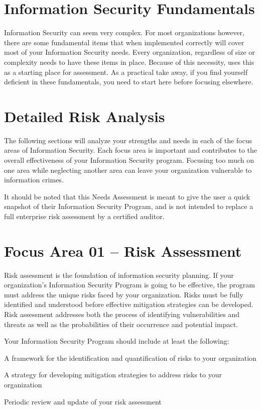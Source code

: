 \documentclass{needs}
\begin{document}
		\overallResults
	
	\section{Information Security Fundamentals}
		Information Security can seem very complex.  For most organizations however, there are some fundamental items that when implemented correctly will cover most of your Information Security needs.  Every organization, regardless of size or complexity needs to have these items in place.  Because of this necessity, \theauthor uses this as a starting place for assessment.  As a practical take away, if you find yourself deficient in these fundamentals, you need to start here before focusing elsewhere.
	
	\infoTable
	
	\section{Detailed Risk Analysis}
		
		The following sections will analyze your strengths and needs in each of the focus areas of Information Security.  Each focus area is important and contributes to the overall effectiveness of your Information Security program.  Focusing too much on one area while neglecting another area can leave your organization vulnerable to information crimes.
		
		It should be noted that this Needs Assessment is meant to give the user a quick snapshot of their Information Security Program, and is not intended to replace a full enterprise risk assessment by a certified auditor.  
	
	\section{Focus Area 01 -- Risk Assessment}
	
		Risk assessment is the foundation of information security planning.  If your organization’s Information Security Program is going to be effective, the program must address the unique risks faced by your organization.  Risks must be fully identified and understood before effective mitigation strategies can be developed.  Risk assessment addresses both the process of identifying vulnerabilities and threats as well as the probabilities of their occurrence and potential impact.
		
		Your Information Security Program should include at least the following: 
		\begin{checklist}
			\item A framework for the identification and quantification of risks to your organization
			\item A strategy for developing mitigation strategies to address risks to your organization
			\item Periodic review and update of your risk assessment
		\end{checklist}	
		
\end{document}
